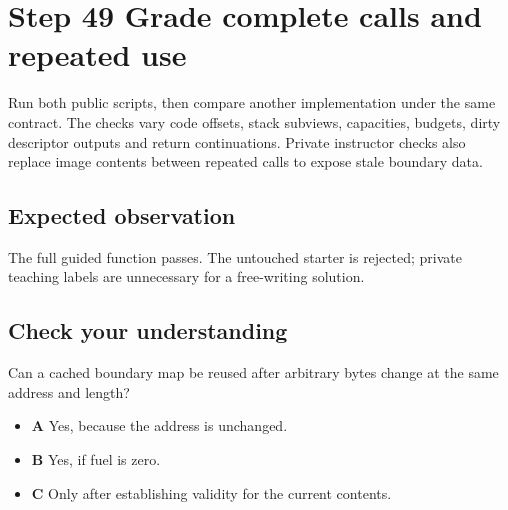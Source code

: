 \section{Step 49 Grade complete calls and repeated use}\label{vm-s49}

Run both public scripts, then compare another implementation under the same contract. The checks vary code offsets, stack subviews, capacities, budgets, dirty descriptor outputs and return continuations. Private instructor checks also replace image contents between repeated calls to expose stale boundary data.

\subsection{Expected observation}
The full guided function passes. The untouched starter is rejected; private teaching labels are unnecessary for a free-writing solution.

\subsection{Check your understanding}
Can a cached boundary map be reused after arbitrary bytes change at the same address and length?

\begin{itemize}
  \item \textbf{A} Yes, because the address is unchanged.
  \item \textbf{B} Yes, if fuel is zero.
  \item \textbf{C} Only after establishing validity for the current contents.
\end{itemize}
